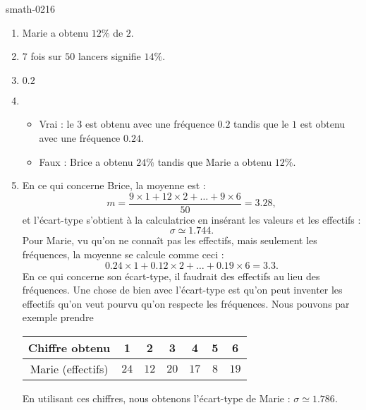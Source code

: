 \begin{corrige}{smath-0216}
\begin{enumerate}
        \item
            Marie a obtenu \( 12\%\) de \( 2\).
        \item
            \( 7\) fois sur \( 50\) lancers signifie \( 14\%\).
        \item
            \( 0.2\) 
        \item
            \begin{itemize}
                \item Vrai : le \( 3\) est obtenu avec une fréquence \( 0.2\) tandis que le \( 1\) est obtenu avec une fréquence \( 0.24\).
                \item Faux : Brice a obtenu \( 24\%\) tandis que Marie a obtenu \( 12\%\).
            \end{itemize}
        \item
            En ce qui concerne Brice, la moyenne est :
            \begin{equation}
                m=\frac{ 9\times 1+12\times 2+\ldots +9\times 6 }{ 50 }=3.28,
            \end{equation}
            et l'écart-type s'obtient à la calculatrice en insérant les valeurs et les effectifs :
            \begin{equation}
                \sigma\simeq 1.744.
            \end{equation}
            Pour Marie, vu qu'on ne connaît pas les effectifs, mais seulement les fréquences, la moyenne se calcule comme ceci :
            \begin{equation}
                0.24\times 1+0.12\times 2+\ldots +0.19\times 6=3.3.
            \end{equation}
            En ce qui concerne son écart-type, il faudrait des effectifs au lieu des fréquences. Une chose de bien avec l'écart-type est qu'on peut inventer les effectifs qu'on veut pourvu qu'on respecte les fréquences. Nous pouvons par exemple prendre  
            \begin{center}
        \begin{tabular}[]{|c||c|c|c|c|c|c|}
            \hline
            Chiffre obtenu&1&2&3&4&5&6\\
            \hline\hline
            Marie (effectifs)&$24$&$12$&$20$&$17$&$8$&$19$\\
            \hline
        \end{tabular}
            \end{center}
            En utilisant ces chiffres, nous obtenons l'écart-type de Marie : \( \sigma\simeq 1.786\).
    \end{enumerate}

\end{corrige}

